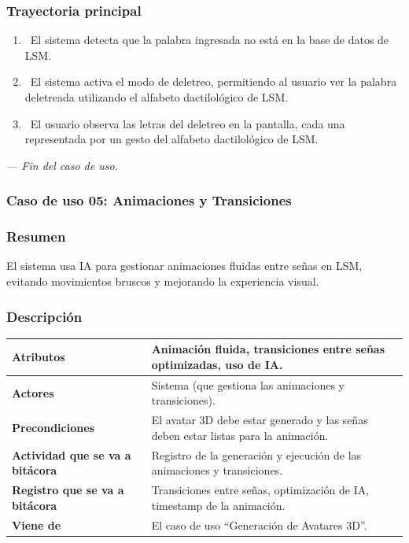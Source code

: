  
\subsubsection{Trayectoria principal}
\begin{enumerate}[label=\textbf{\arabic*}, leftmargin=1.5cm]
    \item \UCsystem \ El sistema detecta que la palabra ingresada no está en la base de datos de LSM.
    
    \item \UCsystem \ El sistema activa el modo de deletreo, permitiendo al usuario ver la palabra deletreada utilizando el alfabeto dactilológico de LSM.
    
    \item \UCactor \ El usuario observa las letras del deletreo en la pantalla, cada una representada por un gesto del alfabeto dactilológico de LSM.

\end{enumerate}

\textit{--- Fin del caso de uso.}

\subsubsection{Caso de uso 05: Animaciones y Transiciones}
\subsubsection{Resumen}
El sistema usa IA para gestionar animaciones fluidas entre señas en LSM, evitando movimientos bruscos y mejorando la experiencia visual.
\subsubsection{Descripción}
\noindent
\begin{tabularx}{\textwidth}{|l|X|}
\hline
\textbf{Atributos} & Animación fluida, transiciones entre señas optimizadas, uso de IA. \\ \hline
\textbf{Actores} & Sistema (que gestiona las animaciones y transiciones). \\ \hline
\textbf{Precondiciones} & El avatar 3D debe estar generado y las señas deben estar listas para la animación. \\ \hline
\textbf{Actividad que se va a bitácora} & Registro de la generación y ejecución de las animaciones y transiciones. \\ \hline
\textbf{Registro que se va a bitácora} & Transiciones entre señas, optimización de IA, timestamp de la animación. \\ \hline
\textbf{Viene de} & El caso de uso “Generación de Avatares 3D”. \\ \hline
\end{tabularx}
    
